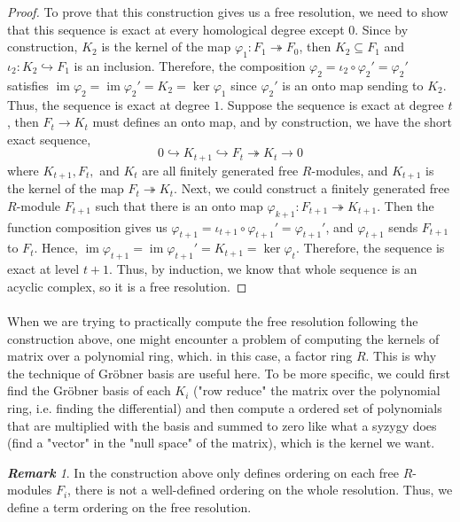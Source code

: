 \documentclass{article}
\newcommand{\im}{\ensuremath{\operatorname{im}}}
\renewcommand{\to}{\ensuremath{\rightarrow}}
\newcommand{\onto}{\ensuremath{\twoheadrightarrow}}
\newcommand{\into}{\ensuremath{\hookrightarrow}}
\theoremstyle{definition}
\theoremstyle{remark}
\newtheorem*{remark}{\textbf{Remark}}
\theoremstyle{example}
\begin{document}
\begin{proof}
    To prove that this construction gives us a free resolution, we need to show that this sequence is exact at every homological degree except $0$. Since by construction, $K_2$ is the kernel of the map $\varphi_1: F_1 \onto F_0$, then $K_2 \subseteq F_1$ and $\iota_2: K_2 \into F_1$ is an inclusion. Therefore, the composition $\varphi_2 = \iota_2 \circ \varphi_2' = \varphi_2'$ satisfies $\im \varphi_2 = \im \varphi_2' = K_2 = \ker \varphi_1$ since $\varphi_2'$ is an onto map sending to $K_2$. Thus, the sequence is exact at degree $1$. Suppose the sequence is exact at degree $t$, then $F_t \to K_t$ must defines an onto map, and by construction, we have the short exact sequence, 
    \begin{equation}
        0 \into K_{t+1} \into F_t \onto K_t \to 0
    \end{equation}
    where $K_{t+1}, F_t,$ and $K_t$ are all finitely generated free $R$-modules, and $K_{t+1}$ is the kernel of the map $F_{t} \onto K_t$. Next, we could construct a finitely generated free $R$-module $F_{t+1}$ such that there is an onto map $\varphi_{k+1}: F_{t+1} \onto K_{t+1}$. Then the function composition gives us $\varphi_{t+1} = \iota_{t+1} \circ \varphi_{t+1}' = \varphi_{t+1}'$, and $\varphi_{t+1}$ sends $F_{t+1}$ to $F_t$. Hence, $\im \varphi_{t+1} = \im \varphi_{t+1}' = K_{t+1} = \ker \varphi_{t}$. Therefore, the sequence is exact at level $t+1$. Thus, by induction, we know that whole sequence is an acyclic complex, so it is a free resolution.
\end{proof}

\paragraph{}

When we are trying to practically compute the free resolution following the construction above, one might encounter a problem of computing the kernels of matrix over a polynomial ring, which. in this case, a factor ring $R$. This is why the technique of Gröbner basis are useful here. To be more specific, we could first find the Gröbner basis of each $K_i$ ("row reduce" the matrix over the polynomial ring, i.e. finding the differential) and then compute a ordered set of polynomials that are multiplied with the basis and summed to zero like what a syzygy does (find a "vector" in the "null space" of the matrix), which is the kernel we want.

\begin{remark}
    In the construction above only defines ordering on each free $R$-modules $F_i$, there is not a well-defined ordering on the whole resolution. Thus, we define a term ordering on the free resolution.
\end{remark}
\end{document}

